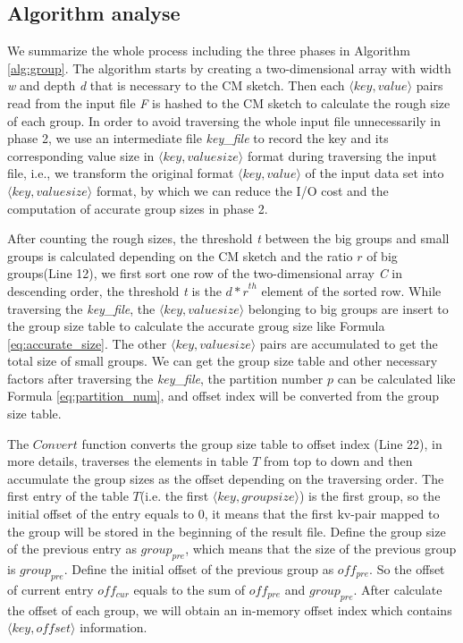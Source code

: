 \subsection{Algorithm analyse}
We summarize the whole process including the three phases in Algorithm \ref{alg:group}. The algorithm starts by creating a two-dimensional array with width \emph{w} and depth \emph{d} that is necessary to the CM sketch. Then each $\langle key, value\rangle$ pairs read from the input file \emph{F} is hashed to the CM sketch to calculate the rough size of each group. In order to avoid traversing the whole input file unnecessarily in phase 2, we use an intermediate file \emph{key\_file} to record the key and its corresponding value size in $\langle key, valuesize\rangle$ format during traversing the input file, i.e., we transform the original format $\langle key, value\rangle$ of the input data set into $\langle key, valuesize\rangle$ format, by which we can reduce the I/O cost and the computation of accurate group sizes in phase 2.

After counting the rough sizes, the threshold \emph{t} between the big groups and small groups is calculated depending on the CM sketch and the ratio $r$ of big groups(Line 12), we first sort one row of the two-dimensional array \emph{C} in descending order, the threshold \emph{t} is the ${d*r}^{th}$ element of the sorted row. While traversing the \emph{key\_file}, the $\langle key, valuesize\rangle$ belonging to big groups are insert to the group size table to calculate the accurate groug size like Formula \ref{eq:accurate_size}. The other $\langle key, valuesize\rangle$ pairs are accumulated to get the total size of small groups. We can get the group size table and other necessary factors after traversing the \emph{key\_file}, the partition number $p$ can be calculated like Formula \ref{eq:partition_num}, and offset index will be converted from the group size table.

The $Convert$ function converts the group size table to offset index (Line 22), in more details, traverses the elements in table $T$ from top to down and then accumulate the group sizes as the offset depending on the traversing order. The first entry of the table $T$(i.e. the first $\langle key, groupsize\rangle$) is the first group, so the initial offset of the entry equals to 0, it means that the first kv-pair mapped to the group will be stored in the beginning of the result file. Define the group size of the previous entry as $group_{pre}$, which means that the size of the previous group is $group_{pre}$. Define the initial offset of the previous group as ${off}_{pre}$. So the offset of current entry ${off}_{cur}$ equals to the sum of ${off}_{pre}$ and $group_{pre}$. After calculate the offset of each group, we will obtain an in-memory offset index which contains $\langle key,offset\rangle$ information. 

